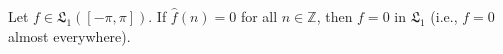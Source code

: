 Let $f \in \mathfrak{L}_1([-\pi, \pi])$. If $\hat{f}(n) = 0$ for all $n \in \mathbb{Z}$, then $f = 0$ in $\mathfrak{L}_1$ (i.e., $f = 0$ almost everywhere).
